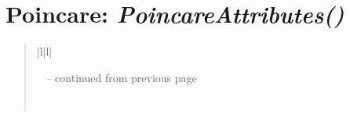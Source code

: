 \documentclass[letterpaper,10pt,english]{sphinxmanual}
\begin{document}
\section{\textbf{Poincare}: \emph{PoincareAttributes()}}
\label{attributes:poincare-poincareattributes}
\begin{DUlineblock}{0em}
\item[] 
\end{DUlineblock}
\begin{quote}

\begin{longtable}{|l|l|}
\hline
\endfirsthead

%
{{\textsf{\tablename\ \thetable{} -- continued from previous page}}} \\
\hline
\endhead

\hline {} \\ \hline
\endfoot

\endlastfoot



\end{longtable}
\end{quote}
\end{document}
